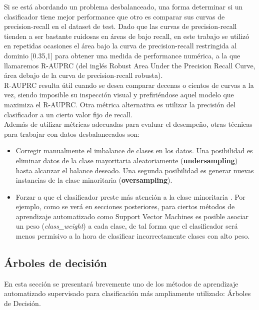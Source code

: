 Si se está abordando un problema desbalanceado, una forma determinar si un clasificador tiene mejor performance que otro es comparar sus curvas de precision-recall en el dataset de test. Dado que las curvas de precision-recall tienden a ser bastante ruidosas en áreas de bajo recall, en este trabajo se utilizó en repetidas ocasiones el área bajo la curva de precision-recall restringida al dominio [0.35,1] para obtener una medida de performance numérica, a la que llamaremos R-AUPRC (del inglés Robust Area Under the Precision Recall Curve, área debajo de la curva de precision-recall robusta).\\


R-AUPRC resulta útil cuando se desea comparar decenas o cientos de curvas a la vez, siendo imposible su inspección visual y prefiriéndose aquel modelo que maximiza el R-AUPRC. Otra métrica alternativa es utilizar la precisión del clasificador a un cierto valor fijo de recall. \\

Además de utilizar métricas adecuadas para evaluar el desempeño, otras técnicas para trabajar con datos desbalanceados son:

\begin{itemize}
\item Corregir manualmente el imbalance de clases en los datos. Una posibilidad es eliminar datos de la clase mayoritaria aleatoriamente (\textbf{undersampling}) \cite{nathalie} hasta alcanzar el balance deseado. Una segunda posibilidad es generar nuevas instancias de la clase minoritaria (\textbf{oversampling}). \cite{he}
\item Forzar a que el clasificador preste más atención a la clase minoritaria \cite{imbalanced_svm}. Por ejemplo, como se verá en secciones posteriores, para ciertos métodos de aprendizaje automatizado como Support Vector Machines es posible asociar un peso (\textit{class\_weight}) a cada clase, de tal forma que el clasificador será menos permisivo a la hora de clasificar incorrectamente clases con alto peso.
\end{itemize}

\subsection{Árboles de decisión}
En esta sección se presentará brevemente uno de los métodos de aprendizaje automatizado supervisado para clasificación más ampliamente utilizado: Árboles de Decisión\cite{mitchell}. \\


